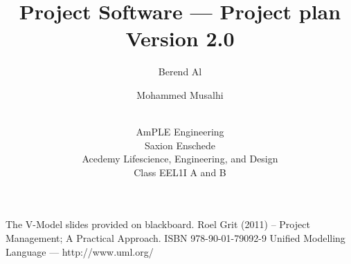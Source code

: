 \documentclass[oneside,a4paper,11pt,titlepage,openany]{report}
\author{
Berend Al \and
Mohammed Musalhi \and
\\
AmPLE Engineering \\
Saxion Enschede \\
Acedemy Lifescience, Engineering, and Design \\
Class EEL1I A and B 
}
\title{Project Software --- Project plan\\\normalsize Version 2.0}
\begin{document}
\maketitle
\tableofcontents
\listoffigures
\listoftables

%

%

%



%

\begin{thebibliography}{99}
The V-Model slides provided on blackboard.
Roel Grit (2011) -- Project Management; A Practical Approach. ISBN 978-90-01-79092-9
Unified Modelling Language --- http://www.uml.org/
\end{thebibliography}
\end{document}
